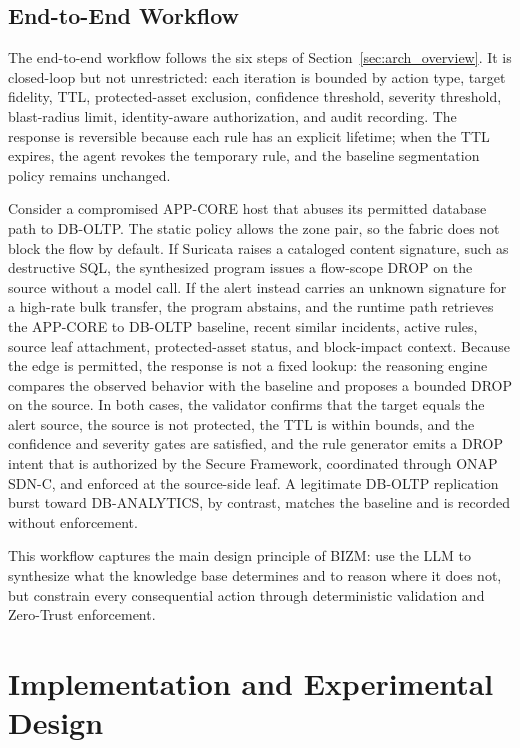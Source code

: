 \documentclass[final,5p]{elsarticle}
\begin{document}
\subsection{End-to-End Workflow}
\label{sec:e2e_workflow}

The end-to-end workflow follows the six steps of Section~\ref{sec:arch_overview}. It is closed-loop but not unrestricted: each iteration is bounded by action type, target fidelity, TTL, protected-asset exclusion, confidence threshold, severity threshold, blast-radius limit, identity-aware authorization, and audit recording. The response is reversible because each rule has an explicit lifetime; when the TTL expires, the agent revokes the temporary rule, and the baseline segmentation policy remains unchanged.

Consider a compromised APP-CORE host that abuses its permitted database path to DB-OLTP. The static policy allows the zone pair, so the fabric does not block the flow by default. If Suricata raises a cataloged content signature, such as destructive SQL, the synthesized program issues a flow-scope DROP on the source without a model call. If the alert instead carries an unknown signature for a high-rate bulk transfer, the program abstains, and the runtime path retrieves the APP-CORE to DB-OLTP baseline, recent similar incidents, active rules, source leaf attachment, protected-asset status, and block-impact context. Because the edge is permitted, the response is not a fixed lookup: the reasoning engine compares the observed behavior with the baseline and proposes a bounded DROP on the source. In both cases, the validator confirms that the target equals the alert source, the source is not protected, the TTL is within bounds, and the confidence and severity gates are satisfied, and the rule generator emits a DROP intent that is authorized by the Secure Framework, coordinated through ONAP SDN-C, and enforced at the source-side leaf. A legitimate DB-OLTP replication burst toward DB-ANALYTICS, by contrast, matches the baseline and is recorded without enforcement.

This workflow captures the main design principle of BIZM: use the LLM to synthesize what the knowledge base determines and to reason where it does not, but constrain every consequential action through deterministic validation and Zero-Trust enforcement.

\section{Implementation and Experimental Design}
\label{sec:implementation_experiment}
\end{document}
